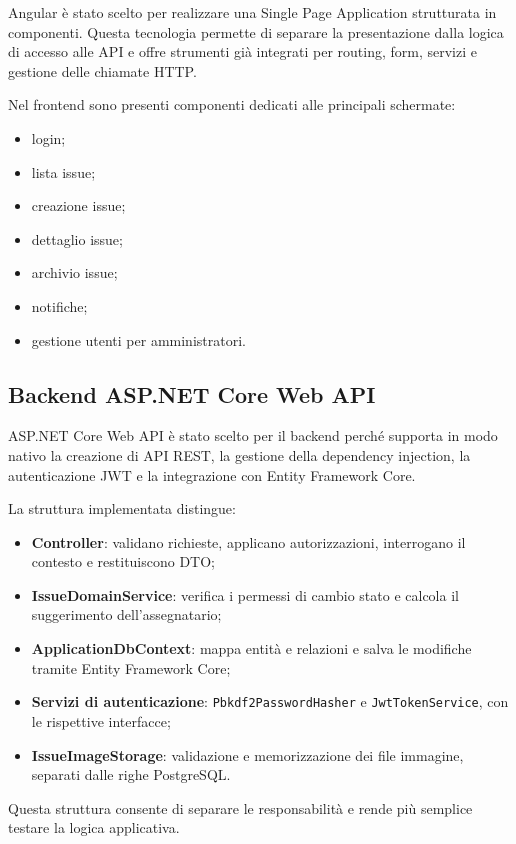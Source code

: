 \documentclass[12pt,a4paper]{article}
\begin{document}
Angular è stato scelto per realizzare una Single Page Application strutturata in componenti. Questa tecnologia permette di separare la presentazione dalla logica di accesso alle API e offre strumenti già integrati per routing, form, servizi e gestione delle chiamate HTTP.

Nel frontend sono presenti componenti dedicati alle principali schermate:

\begin{itemize}
    \item login;
    \item lista issue;
    \item creazione issue;
    \item dettaglio issue;
    \item archivio issue;
    \item notifiche;
    \item gestione utenti per amministratori.
\end{itemize}

\subsection{Backend ASP.NET Core Web API}

ASP.NET Core Web API è stato scelto per il backend perché supporta in modo nativo la creazione di API REST, la gestione della dependency injection, la autenticazione JWT e la integrazione con Entity Framework Core.

La struttura implementata distingue:

\begin{itemize}
    \item \textbf{Controller}: validano richieste, applicano autorizzazioni, interrogano il contesto e restituiscono DTO;
    \item \textbf{IssueDomainService}: verifica i permessi di cambio stato e calcola il suggerimento dell'assegnatario;
    \item \textbf{ApplicationDbContext}: mappa entità e relazioni e salva le modifiche tramite Entity Framework Core;
    \item \textbf{Servizi di autenticazione}: \texttt{Pbkdf2PasswordHasher} e \texttt{JwtTokenService}, con le rispettive interfacce;
    \item \textbf{IssueImageStorage}: validazione e memorizzazione dei file immagine, separati dalle righe PostgreSQL.
\end{itemize}

Questa struttura consente di separare le responsabilità e rende più semplice testare la logica applicativa.
\end{document}
